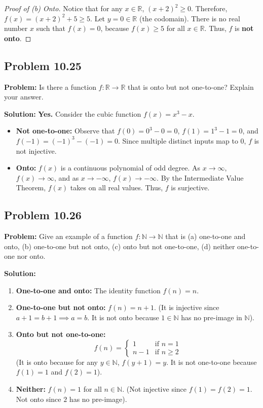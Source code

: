 \documentclass[11pt, a4paper]{article}
\theoremstyle{definition}
\theoremstyle{remark}
\newcommand{\R}{\mathbb{R}}
\newcommand{\N}{\mathbb{N}}
\begin{document}
\begin{proof}[Proof of (b) Onto]
Notice that for any $x \in \R$, $(x+2)^2 \ge 0$. Therefore, $f(x) = (x+2)^2 + 5 \ge 5$. 
Let $y = 0 \in \R$ (the codomain). There is no real number $x$ such that $f(x) = 0$, because $f(x) \ge 5$ for all $x \in \R$. Thus, $f$ is \textbf{not onto}.
\end{proof}

\subsection{Problem 10.25}
\textbf{Problem:} Is there a function $f: \R \to \R$ that is onto but not one-to-one? Explain your answer.

\textbf{Solution:}
\textbf{Yes.} Consider the cubic function $f(x) = x^3 - x$. 
\begin{itemize}
    \item \textbf{Not one-to-one:} Observe that $f(0) = 0^3 - 0 = 0$, $f(1) = 1^3 - 1 = 0$, and $f(-1) = (-1)^3 - (-1) = 0$. Since multiple distinct inputs map to $0$, $f$ is not injective.
    \item \textbf{Onto:} $f(x)$ is a continuous polynomial of odd degree. As $x \to \infty$, $f(x) \to \infty$, and as $x \to -\infty$, $f(x) \to -\infty$. By the Intermediate Value Theorem, $f(x)$ takes on all real values. Thus, $f$ is surjective.
\end{itemize}

\subsection{Problem 10.26}
\textbf{Problem:} Give an example of a function $f: \N \to \N$ that is (a) one-to-one and onto, (b) one-to-one but not onto, (c) onto but not one-to-one, (d) neither one-to-one nor onto.

\textbf{Solution:}
\begin{enumerate}[label=(\a)]
    \item \textbf{One-to-one and onto:} The identity function $f(n) = n$.
    \item \textbf{One-to-one but not onto:} $f(n) = n + 1$. (It is injective since $a+1=b+1 \implies a=b$. It is not onto because $1 \in \N$ has no pre-image in $\N$).
    \item \textbf{Onto but not one-to-one:} 
    \[
    f(n) = \begin{cases} 
      1 & \text{if } n = 1 \\
      n - 1 & \text{if } n \ge 2 
   \end{cases}
    \]
    (It is onto because for any $y \in \N$, $f(y+1) = y$. It is not one-to-one because $f(1) = 1$ and $f(2) = 1$).
    \item \textbf{Neither:} $f(n) = 1$ for all $n \in \N$. (Not injective since $f(1)=f(2)=1$. Not onto since $2$ has no pre-image).
\end{enumerate}
\end{document}
